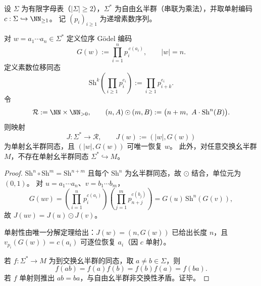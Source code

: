 \begin{theorem}\label{thm:xi-terminal-semidir-godel-register-faithful}
设 \(\Sigma\) 为有限字母表（\(|\Sigma|\ge 2\)），\(\Sigma^\ast\) 为自由幺半群（串联为乘法），并取单射编码
\(
c:\Sigma\hookrightarrow \NN_{\ge 1}
\)。
记 \((p_i)_{i\ge 1}\) 为递增素数序列。

对 \(w=a_1\cdots a_n\in\Sigma^\ast\) 定义位序 Gödel 编码
\[
G(w):=\prod_{i=1}^{n}p_i^{\,c(a_i)},
\qquad
|w|=n.
\]
定义素数位移同态
\[
\mathrm{Sh}^{k}\!\left(\prod_{i\ge1}p_i^{e_i}\right):=\prod_{i\ge1}p_{i+k}^{e_i}.
\]
令
\[
\mathcal R:=\NN\times \NN_{>0},
\qquad
(n,A)\odot(m,B):=\bigl(n+m,\ A\cdot \mathrm{Sh}^{n}(B)\bigr).
\]
则映射
\[
J:\Sigma^\ast\to\mathcal R,\qquad
J(w):=(|w|,G(w))
\]
为单射幺半群同态，且 \((|w|,G(w))\) 可唯一恢复 \(w\)。
此外，对任意交换幺半群 \(M\)，不存在单射幺半群同态 \(\Sigma^\ast\hookrightarrow M\)。
\end{theorem}
\begin{proof}
\(\mathrm{Sh}^{n}\circ\mathrm{Sh}^{m}=\mathrm{Sh}^{n+m}\) 且每个 \(\mathrm{Sh}^n\) 为幺半群同态，故 \(\odot\) 结合，单位元为 \((0,1)\)。
对 \(u=a_1\cdots a_n\)、\(v=b_1\cdots b_m\)，
\[
G(uv)
=\left(\prod_{i=1}^{n}p_i^{c(a_i)}\right)\left(\prod_{j=1}^{m}p_{n+j}^{c(b_j)}\right)
=G(u)\,\mathrm{Sh}^{n}(G(v)),
\]
故 \(J(uv)=J(u)\odot J(v)\)。

单射性由唯一分解定理给出：\(J(w)=(n,G(w))\) 已给出长度 \(n\)，且
\(
v_{p_i}(G(w))=c(a_i)
\)
可逐位恢复 \(a_i\)（因 \(c\) 单射）。

若 \(f:\Sigma^\ast\to M\) 为到交换幺半群的同态，取 \(a\neq b\in\Sigma\)，则
\[
f(ab)=f(a)f(b)=f(b)f(a)=f(ba).
\]
若 \(f\) 单射则推出 \(ab=ba\)，与自由幺半群非交换性矛盾。证毕。
\end{proof}



